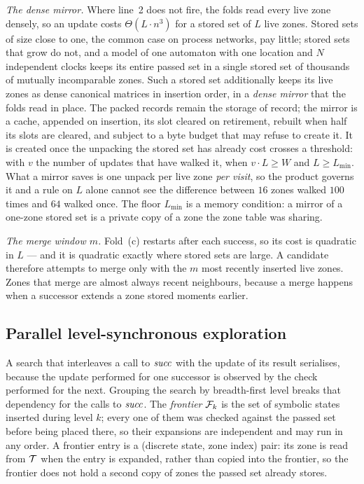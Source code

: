 \emph{The dense mirror.}  Where line~2 does not fire, the folds read every live
zone densely, so an update costs $\Theta(L \cdot n^3)$ for a stored set of $L$
live zones.  Stored sets of size close to one, the common case on process
networks, pay little; stored sets that grow do not, and a model of one automaton
with one location and $N$ independent clocks keeps its entire passed set in a
single stored set of thousands of mutually incomparable zones.  Such a stored set
additionally keeps its live zones as dense canonical matrices in insertion order,
in a \emph{dense mirror} that the folds read in place.  The packed records remain
the storage of record; the mirror is a cache, appended on insertion, its slot
cleared on retirement, rebuilt when half its slots are cleared, and subject to a
byte budget that may refuse to create it.  It is created once the unpacking the
stored set has already cost crosses a threshold: with $v$ the number of updates
that have walked it, when $v \cdot L \ge W$ and $L \ge L_{\min}$.  What a mirror
saves is one unpack per live zone \emph{per visit}, so the product governs it and
a rule on $L$ alone cannot see the difference between $16$ zones walked $100$
times and $64$ walked once.  The floor $L_{\min}$ is a memory condition: a mirror
of a one-zone stored set is a private copy of a zone the zone table was sharing.

\emph{The merge window $m$.}  Fold~(c) restarts after each success, so its cost is
quadratic in $L$ --- and it is quadratic exactly where stored sets are large.  A
candidate therefore attempts to merge only with the $m$ most recently inserted
live zones.  Zones that merge are almost always recent neighbours, because a
merge happens when a successor extends a zone stored moments earlier.

\subsection{Parallel level-synchronous exploration}\label{sec:levels}

\figengine

A search that interleaves a call to $\mathit{succ}$ with the update of its result
serialises, because the update performed for one successor is observed by the
check performed for the next.  Grouping the search by breadth-first level breaks
that dependency for the calls to $\mathit{succ}$.  The \emph{frontier} $\mathcal{F}_k$ is
the set of symbolic states inserted during level $k$; every one of them was
checked against the passed set before being placed there, so their expansions are
independent and may run in any order.  A frontier entry is a (discrete state,
zone index) pair: its zone is read from $\mathcal{T}$ when the entry is expanded, rather
than copied into the frontier, so the frontier does not hold a second copy of
zones the passed set already stores.

